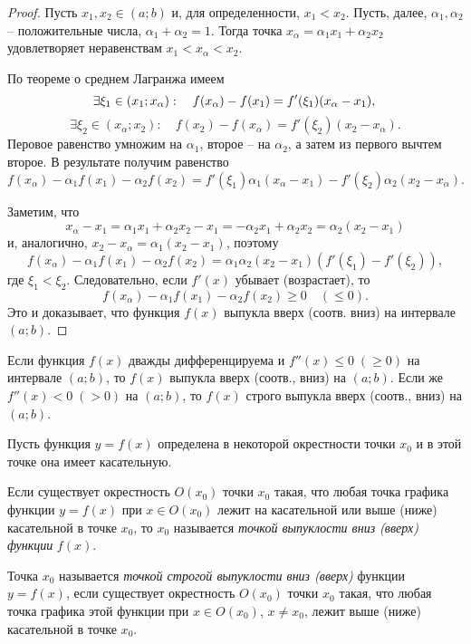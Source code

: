 \begin{proof}
Пусть $x_1,x_2\in(a;b)$ и, для определенности, $x_1<x_2$. Пусть, далее, $\alpha_1, \alpha_2$ -- положительные числа, $\alpha_1+\alpha_2=1$. Тогда точка $x_\alpha=\alpha_1x_1+\alpha_2x_2$ удовлетворяет неравенствам $x_1<x_\alpha<x_2$.

По теореме о среднем Лагранжа имеем
$$
\exists \xi_1\in(x_1;x_\alpha):\quad f(x_\alpha)-f(x_1)=f'(\xi_1)(x_\alpha-x_1),\\
$$
$$
\exists \xi_2\in(x_\alpha;x_2):\quad f(x_2)-f(x_\alpha)=f'(\xi_2)(x_2-x_\alpha).
$$
Перовое равенство умножим на $\alpha_1$, второе  -- на $\alpha_2$, а затем из первого вычтем второе. В результате получим равенство
$$
f(x_\alpha)-\alpha_1f(x_1)-\alpha_2f(x_2)=f'(\xi_1)\alpha_1(x_\alpha-x_1)-f'(\xi_2)\alpha_2(x_2-x_\alpha).
$$

Заметим, что 
$$
x_\alpha-x_1=\alpha_1x_1+\alpha_2x_2-x_1=-\alpha_2x_1+\alpha_2x_2=\alpha_2(x_2-x_1)
$$
и, аналогично, $x_2-x_\alpha=\alpha_1(x_2-x_1)$, поэтому
$$
f(x_\alpha)-\alpha_1f(x_1)-\alpha_2f(x_2)=\alpha_1\alpha_2(x_2-x_1)(f'(\xi_1)-f'(\xi_2)),
$$
где $\xi_1<\xi_2$. Следовательно, если $f'(x)$ убывает (возрастает), то 
$$
f(x_\alpha)-\alpha_1f(x_1)-\alpha_2f(x_2)\geq 0 \quad(\leq 0).
$$
Это и доказывает, что функция $f(x)$ выпукла вверх (соотв. вниз) на интервале $(a;b)$.
\end{proof}
\begin{cons}
Если функция $f(x)$ дважды дифференцируема и $f''(x)\leq 0\;(\geq 0)$ на интервале $(a;b)$, то $f(x)$ выпукла вверх (соотв., вниз) на $(a;b)$. Если же $f''(x)<0\;(>0)$ на $(a;b)$, то $f(x)$ строго выпукла вверх (соотв., вниз) на $(a;b)$.
\end{cons}


Пусть функция $y=f(x)$ определена в некоторой окрестности точки $x_0$ и в этой точке она имеет касательную.

\begin{defn}
Если существует окрестность $O(x_0)$ точки $x_0$ такая, что любая точка графика функции $y=f(x)$ при $x\in O(x_0)$ лежит на касательной или выше (ниже) касательной в точке $x_0$, то $x_0$ называется \textit{точкой выпуклости вниз (вверх) функции } $f(x)$.
\end{defn}

\begin{defn}
Точка $x_0$ называется \textit{точкой строгой выпуклости вниз (вверх)} функции $y=f(x)$, если существует окрестность $O(x_0)$ точки $x_0$ такая, что любая точка графика этой функции при $x\in O(x_0)$, $x\neq x_0$, лежит выше (ниже) касательной в точке $x_0$.
\end{defn}


